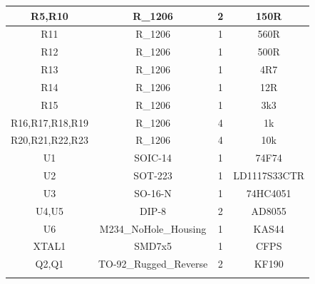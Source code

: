 \begin{table}[H]
\begin{center}
\begin{tabular}[H]{!{\vrule width 1pt}c|c|c|c!{\vrule width 1pt}}
			R5,R10	&	R\_1206	&	2	&	150R	\\\hline
			R11	&	R\_1206	&	1	&	560R	\\\hline
			R12	&	R\_1206	&	1	&	500R	\\\hline
			R13	&	R\_1206	&	1	&	4R7	\\\hline
			R14	&	R\_1206	&	1	&	12R	\\\hline
			R15	&	R\_1206	&	1	&	3k3	\\\hline
			R16,R17,R18,R19	&	R\_1206	&	4	&	1k	\\\hline
			R20,R21,R22,R23	&	R\_1206	&	4	&	10k	\\\hline
			U1	&	SOIC-14	&	1	&	74F74	\\\hline
			U2	&	SOT-223	&	1	&	LD1117S33CTR	\\\hline
			U3	&	SO-16-N	&	1	&	74HC4051	\\\hline
			U4,U5	&	DIP-8	&	2	&	AD8055	\\\hline
			U6	&	M234\_NoHole\_Housing	&	1	&	KAS44	\\\hline
			XTAL1	&	SMD7x5	&	1	&	CFPS	\\\hline
			Q2,Q1	&	TO-92\_Rugged\_Reverse	&	2	&	KF190 \\\specialrule{1pt}{0pt}{0pt} 
		\end{tabular}  
	\end{center}
\end{table}

